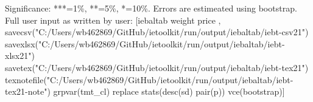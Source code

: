 Significance: ***=1\%, **=5\%, *=10\%. Errors are estimeated using bootstrap. Full user input as written by user: [iebaltab weight price , savecsv("C:/Users/wb462869/GitHub/ietoolkit/run/output/iebaltab/iebt-csv21") savexlsx("C:/Users/wb462869/GitHub/ietoolkit/run/output/iebaltab/iebt-xlsx21") savetex("C:/Users/wb462869/GitHub/ietoolkit/run/output/iebaltab/iebt-tex21") texnotefile("C:/Users/wb462869/GitHub/ietoolkit/run/output/iebaltab/iebt-tex21-note") grpvar(tmt\_cl) replace stats(desc(sd) pair(p)) vce(bootstrap)]
